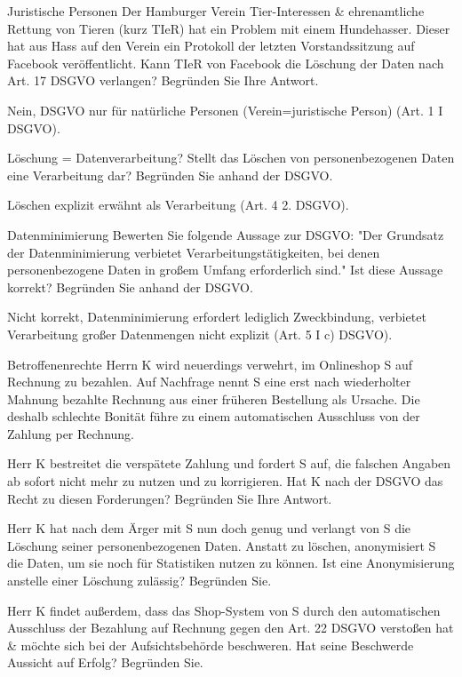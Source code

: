 \documentclass{exercisesheet}
\begin{document}
\begin{exercise}{Juristische Personen}
  Der Hamburger Verein Tier-Interessen \& ehrenamtliche Rettung von Tieren (kurz TIeR) hat ein Problem mit einem Hundehasser. Dieser hat aus Hass auf den Verein ein Protokoll der letzten Vorstandssitzung auf Facebook veröffentlicht. Kann TIeR von Facebook die Löschung der Daten nach Art. 17 DSGVO verlangen? Begründen Sie Ihre Antwort.

  \begin{solution}
    Nein, DSGVO nur für natürliche Personen (Verein=juristische Person) (Art. 1 I DSGVO).
  \end{solution}
\end{exercise}

\begin{exercise}{Löschung = Datenverarbeitung?}
  Stellt das Löschen von personenbezogenen Daten eine Verarbeitung dar? Begründen Sie anhand der DSGVO.

  \begin{solution}
    Löschen explizit erwähnt als Verarbeitung (Art. 4 2. DSGVO).
  \end{solution}
\end{exercise}

\begin{exercise}{Datenminimierung}
  Bewerten Sie folgende Aussage zur DSGVO: "Der Grundsatz der Datenminimierung verbietet Verarbeitungstätigkeiten, bei denen personenbezogene Daten in großem Umfang erforderlich sind." Ist diese Aussage korrekt? Begründen Sie anhand der DSGVO.

  \begin{solution}
    Nicht korrekt, Datenminimierung erfordert lediglich Zweckbindung, verbietet Verarbeitung großer Datenmengen nicht explizit (Art. 5 I c) DSGVO).
  \end{solution}
\end{exercise}

\begin{eexercises}{Betroffenenrechte}{
    Herrn K wird neuerdings verwehrt, im Onlineshop S auf Rechnung zu bezahlen. Auf Nachfrage nennt S eine erst nach wiederholter Mahnung bezahlte Rechnung aus einer früheren Bestellung als Ursache. Die deshalb schlechte Bonität führe zu einem automatischen Ausschluss von der Zahlung per Rechnung.
  }
  \item Herr K bestreitet die verspätete Zahlung und fordert S auf, die falschen Angaben ab sofort nicht mehr zu nutzen und zu korrigieren. Hat K nach der DSGVO das Recht zu diesen Forderungen? Begründen Sie Ihre Antwort.
  \item Herr K hat nach dem Ärger mit S nun doch genug und verlangt von S die Löschung seiner personenbezogenen Daten. Anstatt zu löschen, anonymisiert S die Daten, um sie noch für Statistiken nutzen zu können. Ist eine Anonymisierung anstelle einer Löschung zulässig? Begründen Sie.
  \item Herr K findet außerdem, dass das Shop-System von S durch den automatischen Ausschluss der Bezahlung auf Rechnung gegen den Art. 22 DSGVO verstoßen hat \& möchte sich bei der Aufsichtsbehörde beschweren. Hat seine Beschwerde Aussicht auf Erfolg? Begründen Sie.
\end{eexercises}
\end{document}
